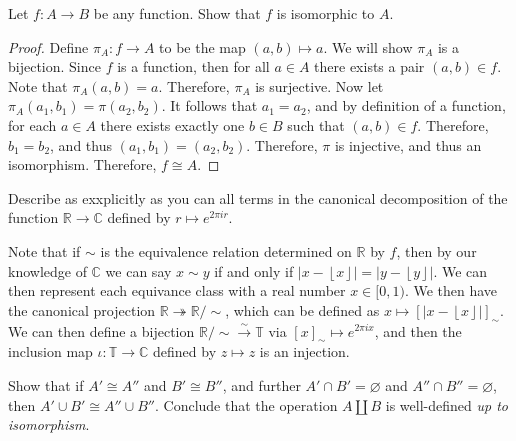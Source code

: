 \documentclass[11pt]{report}
\newcommand{\tildesim}{\mathbin{\sim}}
\begin{document}
\begin{exercise}
	Let $f : A \to B$ be any function. Show that $f$ is isomorphic to $A$.
\end{exercise}
\begin{proof}
	Define $\pi_A : f \to A$ to be the map $(a,b)\mapsto a$. We will show $\pi_A$ is a bijection. Since $f$ is a function, then for all $a\in A$ there exists a pair $(a,b)\in f$. Note that $\pi_A(a,b)=a$. Therefore, $\pi_A$ is surjective. Now let $\pi_A(a_1,b_1)=\pi (a_2,b_2)$. It follows that $a_1=a_2$, and by definition of a function, for each $a\in A$ there exists exactly one $b\in B$ such that $(a,b)\in f$. Therefore, $b_1=b_2$, and thus $(a_1,b_1)=(a_2,b_2)$. Therefore,  $\pi $ is injective, and thus an isomorphism. Therefore, $f\cong A$.
\end{proof}
\begin{exercise}
	Describe as exxplicitly as you can all terms in the canonical decomposition of the function $\mathbb{R}\to \mathbb{C}$ defined by $r\mapsto e^{2\pi ir}$.
\end{exercise}
\begin{solution}
	Note that if $\sim $ is the equivalence relation determined on $\mathbb{R}$ by $f$, then by our knowledge of $\mathbb{C}$ we can say $x\sim y$ if and only if $|x-\left\lfloor x \right\rfloor|=|y-\left\lfloor y \right\rfloor|$. We can then represent each equivance class with a real number $x\in[0,1)$. We then have the canonical projection $\mathbb{R}\twoheadrightarrow \mathbb{R} /\tildesim $, which can be defined as $x\mapsto \left[ \left| x-\left\lfloor x \right\rfloor \right|  \right]_\sim $. We can then define a bijection $\mathbb{R} /\tildesim \xrightarrow{\sim }\mathbb{T}$ via $[x]_\sim \mapsto e^{2\pi ix}$, and then the inclusion map $\iota  : \mathbb{T} \to \mathbb{C}$ defined by $z\mapsto z$ is an injection.
\end{solution}
\begin{exercise}
	Show that if $A'\cong A''$ and $B'\cong B''$, and further $A'\cap B'=\varnothing$ and $A''\cap B''=\varnothing$, then $A'\cup B'\cong A''\cup B''$. Conclude that the operation $A\amalg B$ is well-defined \emph{up to isomorphism}.
\end{exercise}
\end{document}
